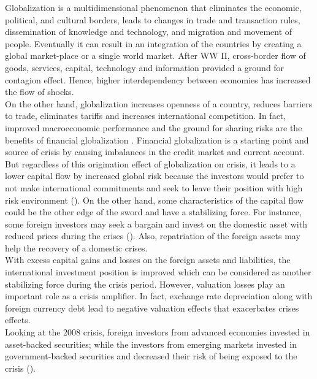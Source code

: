 \documentclass{article}
\begin{document}
Globalization is a multidimensional phenomenon that eliminates the economic, political, and cultural borders, leads to changes in trade and transaction rules, dissemination of knowledge and technology, and migration and movement of people. Eventually it can result in an integration of the countries by creating a global market-place or a single world market. After WW II, cross-border flow of goods, services, capital, technology and information provided a ground for contagion effect. Hence, higher interdependency between economies has increased the flow of shocks. \\
On the other hand, globalization increases openness of a country, reduces barriers to trade, eliminates tariffs and increases international competition. In fact, improved macroeconomic performance and the ground for sharing risks are the benefits of financial globalization \cite{kose2009does}. Financial globalization is a starting point and source of crisis by causing imbalances in the credit market and current account. But regardless of this origination effect of globalization on crisis, it leads to a lower capital flow by increased global risk because the investors would prefer to not make international commitments and seek to leave their position with high risk environment (\cite{forbes2012capital, lane2013financial}). On the other hand, some characteristics of the capital flow could be the other edge of the sword and have a stabilizing force. For instance, some foreign investors may seek a bargain and invest on the domestic asset with reduced prices during the crises (\cite{lane2013financial}). Also, repatriation of the foreign assets may help the recovery of a domestic crises.  \\ 
With excess capital gains and losses on the foreign assets and liabilities, the international investment position is improved which can be considered as another stabilizing force during the crisis period. However, valuation losses play an important role as a crisis amplifier. In fact, exchange rate depreciation along with foreign currency debt lead to negative valuation effects that exacerbates crises effects.  \\
Looking at the 2008 crisis, foreign investors from advanced economies invested in asset-backed securities; while the investors from emerging markets invested in government-backed securities and decreased their risk of being exposed to the crisis (\cite{lane2013financial}).  \\
\end{document}
